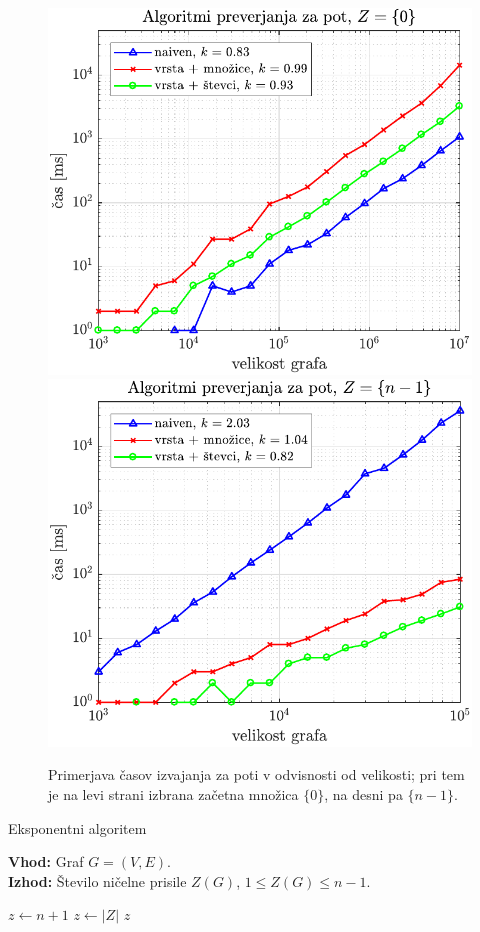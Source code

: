 \documentclass{beamer}
\begin{document}
\begin{frame}{}
    \begin{figure}
        \centering
        \includegraphics[width=0.49\linewidth]{../koda/results/plots/pot_prvo_vozlisce.pdf}
        \includegraphics[width=0.49\linewidth]{../koda/results/plots/pot_zadnje_vozlisce.pdf}
        \caption{Primerjava časov izvajanja za poti v odvisnosti od velikosti; pri tem je na levi strani izbrana začetna množica $\{ 0 \}$, na desni pa $\{n-1\}$.}
    \end{figure}
\end{frame}

\begin{frame}{Eksponentni algoritem}
    \begin{algorithm}[H]
        \caption{}
        \raggedright
        \textbf{Vhod:} Graf $G = (V,E)$. \\
        \textbf{Izhod:} Število ničelne prisile $Z(G)$, $1 \leq Z(G) \leq n-1$.
        \begin{algorithmic}[1]
            \State $z \gets n+1$
            \State $z \gets |Z|$
            \EndIf
            \EndFor
            \State \Return $z$
        \end{algorithmic}
    \end{algorithm}
\end{frame}
\end{document}
